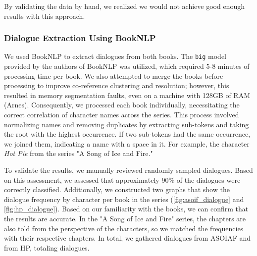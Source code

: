 \documentclass[fleqn,moreauthors,10pt]{ds_report}
\begin{document}
By validating the data by hand, we realized we would not achieve good enough results with this approach.

\subsubsection*{Dialogue Extraction Using BookNLP}

We used BookNLP to extract dialogues from both books. The \texttt{big} model provided by the authors of BookNLP was utilized, which required 5-8 minutes of processing time per book. We also attempted to merge the books before processing to improve co-reference clustering and resolution; however, this resulted in memory segmentation faults, even on a machine with 128GB of RAM (Arnes). Consequently, we processed each book individually, necessitating the correct correlation of character names across the series. This process involved normalizing names and removing duplicates by extracting sub-tokens and taking the root with the highest occurrence. If two sub-tokens had the same occurrence, we joined them, indicating a name with a space in it. For example, the character \textit{Hot Pie} from the series "A Song of Ice and Fire."

To validate the results, we manually reviewed randomly sampled dialogues. Based on this assessment, we assessed that approximately 90\% of the dialogues were correctly classified. Additionally, we constructed two graphs that show the dialogue frequency by character per book in the series (\cref{fig:asoif_dialogue} and \cref{fig:hp_dialogue}). Based on our familiarity with the books, we can confirm that the results are accurate. In the "A Song of Ice and Fire" series, the chapters are also told from the perspective of the characters, so we matched the frequencies with their respective chapters. In total, we gathered  dialogues from ASOIAF and  from HP, totaling  dialogues.
\end{document}
